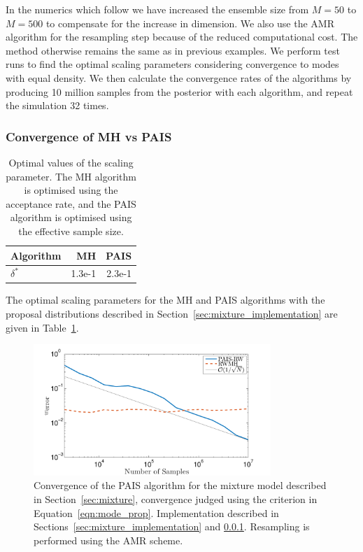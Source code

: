 \documentclass[final]{siamltex}
\begin{document}
In the numerics which follow we have increased the ensemble size from
$M=50$ to $M=500$ to compensate for the increase in dimension. We also
use the AMR algorithm for the resampling step because of the reduced
computational cost. The method otherwise remains the same as in
previous examples. We perform test runs to find the optimal scaling
parameters considering convergence to modes with equal density. We
then calculate the convergence rates of the algorithms by producing 10
million samples from the posterior with each algorithm, and repeat the
simulation 32 times.

\subsubsection{Convergence of MH vs PAIS}\label{sec:mixture_conv}

\begin{table}[!htb]
      \centering
        \begin{tabular}{|l|r|r|}
	\hline
	Algorithm	& MH & PAIS \\ \hline
	$\delta^*$	& 1.3e-1     & 2.3e-1 \\
	\hline
	\end{tabular}
	\vspace{1mm}
	\caption{Optimal values of the scaling parameter. The MH algorithm is optimised using the acceptance rate, and the PAIS algorithm is optimised using the effective sample size.}
	\label{table:mixture_opt_beta}
\end{table}

The optimal scaling parameters for the MH and PAIS algorithms with the proposal distributions described in Section~\ref{sec:mixture_implementation} are given in Table~\ref{table:mixture_opt_beta}.

\begin{figure}[htb]
\centering
\includegraphics[width=0.8\textwidth]{"figures/Mode_proportions"}
\caption{Convergence of the PAIS algorithm for the mixture model described in Section~\ref{sec:mixture}, convergence judged using the criterion in Equation~\eqref{eqn:mode_prop}. Implementation described in Sections~\ref{sec:mixture_implementation} and \ref{sec:mixture_conv}. Resampling is performed using the AMR scheme.}
\label{fig:mixture_modes}
\end{figure}
\end{document}
